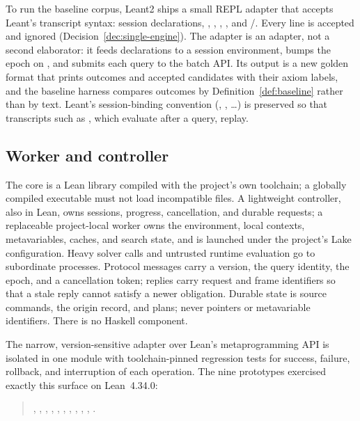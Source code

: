 To run the baseline corpus, Leant2 ships a small REPL adapter that accepts Leant's transcript syntax: session declarations, , , , , and /. Every  line is accepted and ignored (Decision~\ref{dec:single-engine}). The adapter is an adapter, not a second elaborator: it feeds declarations to a session environment, bumps the epoch on , and submits each query to the batch API. Its output is a new golden format that prints outcomes and accepted candidates with their axiom labels, and the baseline harness compares outcomes by Definition~\ref{def:baseline} rather than by text. Leant's session-binding convention (, , \ldots) is preserved so that transcripts such as , which evaluate  after a query, replay.

\subsection{Worker and controller}

The core is a Lean library compiled with the project's own toolchain; a globally compiled executable must not load incompatible  files. A lightweight controller, also in Lean, owns sessions, progress, cancellation, and durable requests; a replaceable project-local worker owns the environment, local contexts, metavariables, caches, and search state, and is launched under the project's Lake configuration. Heavy solver calls and untrusted runtime evaluation go to subordinate processes. Protocol messages carry a version, the query identity, the epoch, and a cancellation token; replies carry request and frame identifiers so that a stale reply cannot satisfy a newer obligation. Durable state is source commands, the origin record, and plans; never pointers or metavariable identifiers. There is no Haskell component.

The narrow, version-sensitive adapter over Lean's metaprogramming API is isolated in one module with toolchain-pinned regression tests for success, failure, rollback, and interruption of each operation. The nine prototypes exercised exactly this surface on Lean~4.34.0:
\begin{quote}\raggedright\small
{}, , , , , , , , , , .
\end{quote}

